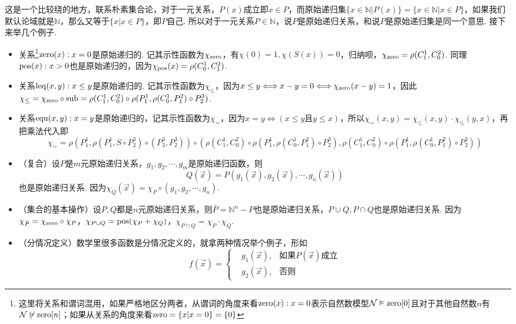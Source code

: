 这是一个比较绕的地方，联系朴素集合论，对于一元关系，\(P(x)\)成立即\(x \in P\)，而原始递归集\(\{x \in \mathbb{N} | P(x)\} = \{x \in \mathbb{N} | x \in P\}\)，如果我们默认论域就是\(\mathbb{N}\)，那么又等于\(\{x| x \in P\}\)，即\(P\)自己. 所以对于一元关系\(P \in \mathbb{N}\)，说\(P\)是原始递归关系，和说\(P\)是原始递归集是同一个意思. 接下来举几个例子.
\begin{itemize}
    \item 关系\footnote{这里将关系和谓词混用，如果严格地区分两者，从谓词的角度来看\({\rm zero}(x): x=0\)表示自然数模型\(\mathcal{N} \vDash {\rm zero}[0]\)且对于其他自然数\(n\)有\(\mathcal{N} \not\vDash {\rm zero}[n]\)；如果从关系的角度来看\({\rm zero} = \{x | x=0\} = \{0\}\)}\({\rm zero}(x): x=0\)是原始递归的. 记其示性函数为\(\chi_{\rm zero}\)，有\(\chi(0)=1,\chi(S(x))=0\)，归纳呗，\(\chi_{\rm zero} = \rho(C^1_1,C^2_0)\). 同理\({\rm pos}(x): x > 0\)也是原始递归的，因为\(\chi_{\rm pos}(x) = \rho(C^1_0,C^2_1)\).
    \item 关系\({\rm leq}(x,y):x \leq y\)是原始递归的. 记其示性函数为\(\chi_\leq\)，因为\(x \leq y \Longleftrightarrow x-y = 0 \Longleftrightarrow \chi_{\rm zero}(x-y)=1\)，因此\(\chi_\leq = \chi_{\rm zero} \circ {\rm sub} = \rho(C^1_1,C^2_0) \circ \rho(P^1_1, \rho(C^1_0, P^2_1) \circ P^3_2)\).
    \item 关系\({\rm equ}(x,y): x=y\)是原始递归的，记其示性函数为\(\chi_=\)，因为\(x = y \Longleftrightarrow (x \leq y\mbox{且}y \leq x)\)，所以\(\chi_=(x,y) = \chi_\leq(x,y) \cdot \chi_\leq(y,x)\)，再把乘法代入即
    \[\chi_= = \rho(P^1_1,\rho(P^1_1,S\circ P^3_2) \circ (P^3_3,P^3_2)) \circ (\rho(C^1_1,C^2_0) \circ \rho(P^1_1, \rho(C^1_0, P^2_1) \circ P^3_2),\rho(C^1_1,C^2_0) \circ \rho(P^1_1, \rho(C^1_0, P^2_1) \circ P^3_2))\]
    \item （复合）设\(P\)是\(m\)元原始递归关系，\(g_1,g_2,\cdots,g_m\)是原始递归函数，则
    \[Q(\vec x) = P(g_1(\vec x), g_2(\vec x), \cdots, g_n(\vec x))\]
    也是原始递归关系. 因为\(\chi_Q(\vec x) = \chi_P \circ (g_1,g_2,\cdots,g_n)\).
    \item （集合的基本操作）设\(P,Q\)都是\(n\)元原始递归关系，则\(\bar P = \mathbb{N}^n - P\)也是原始递归关系，\(P \cup Q, P \cap Q\)也是原始递归关系. 因为\(\chi_{\bar P} = \chi_{\rm zero} \circ \chi_P\)，\(\chi_{P \cup Q} = {\rm pos}(\chi_{P} + \chi_{Q})\)，\(\chi_{P \cap Q} = \chi_P \cdot \chi_Q\).
    \item （分情况定义）数学里很多函数是分情况定义的，就拿两种情况举个例子，形如
    \[f(\vec x) = \left\{ \begin{aligned} &g_1(\vec x), &\mbox{如果}P(\vec x)\mbox{成立} \\ &g_2(\vec x), &\mbox{否则} \end{aligned} \right.\]

\end{itemize}
